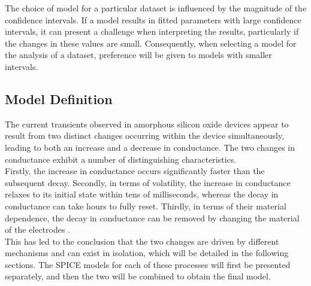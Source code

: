 \noindent The choice of model for a particular dataset is influenced by the magnitude of the confidence intervals. If a model results in fitted parameters with large confidence intervals, it can present a challenge when interpreting the results, particularly if the changes in these values are small. Consequently, when selecting a model for the analysis of a dataset, preference will be given to models with smaller intervals.


\subsection[Model Definition]{Model Definition}

The current transients observed in amorphous silicon oxide devices appear to result from two distinct changes occurring within the device simultaneously, leading to both an increase and a decrease in conductance. The two changes in conductance exhibit a number of distinguishing characteristics. \\

\noindent Firstly, the increase in conductance occurs significantly faster than the subsequent decay. Secondly, in terms of volatility, the increase in conductance relaxes to its initial state within tens of milliseconds, whereas the decay in conductance can take hours to fully reset. Thirdly, in terms of their material dependence, the decay in conductance can be removed by changing the material of the electrodes \cite{mannion2022current}. \\

\noindent This has led to the conclusion that the two changes are driven by different mechanisms and can exist in isolation, which will be detailed in the following sections. The SPICE models for each of these processes will first be presented separately, and then the two will be combined to obtain the final model.

